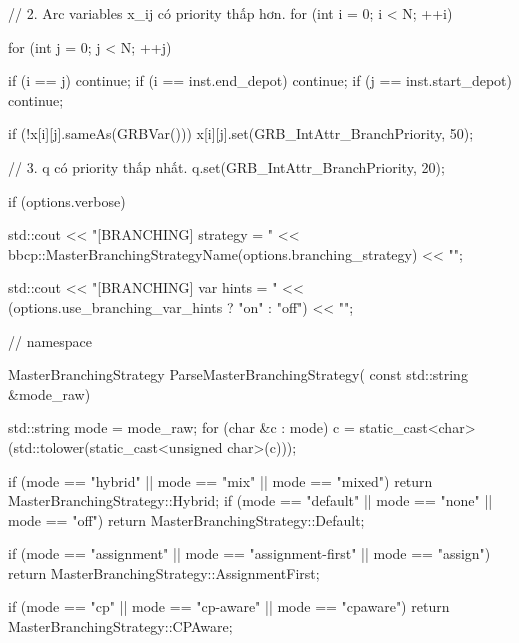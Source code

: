 {{{{                // 2. Arc variables x_ij có priority thấp hơn.
                for (int i = 0; i < N; ++i)
                {
                    for (int j = 0; j < N; ++j)
                    {
                        if (i == j)
                            continue;
                        if (i == inst.end_depot)
                            continue;
                        if (j == inst.start_depot)
                            continue;

                        if (!x[i][j].sameAs(GRBVar()))
                        {
                            x[i][j].set(GRB_IntAttr_BranchPriority, 50);
                        }
                    }
                }

                // 3. q có priority thấp nhất.
                q.set(GRB_IntAttr_BranchPriority, 20);

                if (options.verbose)
                {
                    std::cout << "[BRANCHING] strategy = "
                              << bbcp::MasterBranchingStrategyName(options.branching_strategy)
                              << "\n";

                    std::cout << "[BRANCHING] var hints = "
                              << (options.use_branching_var_hints ? "on" : "off")
                              << "\n";
                }
            }

        } // namespace

        MasterBranchingStrategy ParseMasterBranchingStrategy(
            const std::string &mode_raw)
        {
            std::string mode = mode_raw;
            for (char &c : mode)
            {
                c = static_cast<char>(std::tolower(static_cast<unsigned char>(c)));
            }

            if (mode == "hybrid" ||
                mode == "mix" ||
                mode == "mixed")
            {
                return MasterBranchingStrategy::Hybrid;
            }
            if (mode == "default" || mode == "none" || mode == "off")
            {
                return MasterBranchingStrategy::Default;
            }

            if (mode == "assignment" ||
                mode == "assignment-first" ||
                mode == "assign")
            {
                return MasterBranchingStrategy::AssignmentFirst;
            }

            if (mode == "cp" ||
                mode == "cp-aware" ||
                mode == "cpaware")
            {
                return MasterBranchingStrategy::CPAware;
            }

}}}
